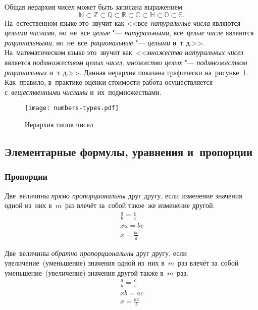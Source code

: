 \documentclass[]{scrartcl}
\begin{document}
Общая иерархия чисел может быть записана выражением
\begin{equation}\label{eq:numbers-hierarchy}
\mathbb{N} \subset \mathbb{Z} \subset \mathbb{Q} \subset \mathbb{R} \subset \mathbb{C} \subset \mathbb{H} \subset \mathbb{O} \subset \mathbb{S}.
\end{equation}
На~естественном языке это~звучит как <<все~\emph{натуральные числа} являются \emph{целыми числам}и, но~не~все \emph{целые} "--- \emph{натуральными}, все~\emph{целые числе} являются \emph{рациональными}, но~не~все~\emph{рациональные} "--- \emph{целыми} и~т.\,д.>>. На~математическом языке это~звучит как~<<\emph{множество натуральных чисел} является \emph{подмножеством целых чисел}, \emph{множество целых} "--- \emph{подмножеством рациональных} и~т.\,д.>>. Данная иерархия показана графически на~рисунке~\ref{fig:numbers-types}. Как~правило, в~практике оценки стоимости работа осуществляется с~\emph{вещественными числами} и~их~подмножествами.

\begin{figure}[ht]
	\centering %
	\texttt{[image: numbers-types.pdf]}
	\caption{Иерархия типов чисел \cite{Wiki:numbers-types}}\label{fig:numbers-types}
\end{figure}

\subsection{Элементарные формулы, уравнения и~пропорции}
\subsubsection{Пропорции}

Две~величины \emph{прямо пропорциональны} друг другу, если изменение значения одной из~них в~$m$~раз влечёт за~собой такое~же изменение другой.
\begin{equation}\label{simple-dir-prop1}
	\begin{aligned}
		\frac{a}{b}=\frac{c}{x} \\
		xa = bc \\
		x = \frac{bc}{a}
	\end{aligned}
\end{equation} 

Две~величины \emph{обратно пропорциональны} друг другу, если увеличение~(уменьшение) значения одной из~них в~$m$~раз влечёт за~собой уменьшение~(увеличение) значения другой также в~$m$~раз.
\begin{equation}\label{simple-inv-prop1}
\begin{aligned}
\frac{a}{b}=\frac{c}{x} \\
xb = ac \\
x = \frac{ac}{b}
\end{aligned}
\end{equation}
\end{document}
